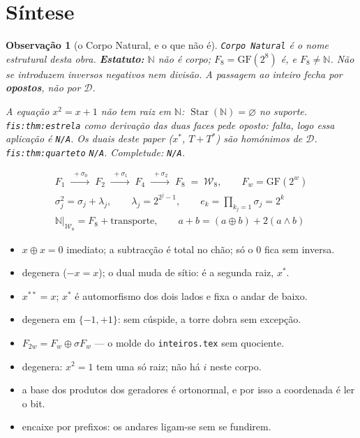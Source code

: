 \documentclass[11pt,a4paper]{article}
\newtheorem{observacao}{Observação}
\newcommand{\code}[1]{\texttt{\small #1}}
\newcommand{\Word}{\mathcal{W}}
\begin{document}
\section*{Síntese}

\begin{observacao}[o Corpo Natural, e o que não é]
\texttt{Corpo Natural} é o nome estrutural desta obra. \textbf{Estatuto:}
$\mathbb{N}$ não é corpo; $F_8=\mathrm{GF}(2^{8})$ é, e $F_8\neq\mathbb{N}$.
Não se introduzem inversos negativos nem divisão. A passagem ao inteiro fecha
por \textbf{opostos}, não por $\mathcal{D}$.

A equação $x^{2}=x+1$ não tem raiz em $\mathbb{N}$:
$\operatorname{Star}(\mathbb{N})=\varnothing$ no suporte.
\code{fis:thm:estrela} como derivação das duas faces pede oposto: falta, logo
essa aplicação é \texttt{N/A}. Os duais deste paper ($x^{*}$, $T+T^{*}$) são
homónimos de $\mathcal{D}$. \code{fis:thm:quarteto} \texttt{N/A}. Completude:
\texttt{N/A}.
\end{observacao}

\[
\boxed{
\begin{array}{c}
F_1\;\xrightarrow{\;+\sigma_0\;}\;F_2\;\xrightarrow{\;+\sigma_1\;}\;F_4
\;\xrightarrow{\;+\sigma_2\;}\;F_8\;=\;\Word_8,
\qquad F_w=\mathrm{GF}(2^{w})\\[3pt]
\sigma_j^{2}=\sigma_j+\lambda_j,\qquad \lambda_j=2^{2^{j}-1},\qquad
e_k=\textstyle\prod_{k_j=1}\sigma_j=2^{k}\\[3pt]
\mathbb{N}\big|_{\Word_8}=F_8+\text{transporte},\qquad
a+b=(a\oplus b)+2(a\wedge b)
\end{array}}
\]

\begin{itemize}\itemsep2pt
\item[\textbf{0}] $x\oplus x=0$ imediato; a subtracção é total no chão; só o $0$ fica sem inversa.
\item[\textbf{1}] degenera ($-x=x$); o dual muda de sítio: é a segunda raiz, $x^{*}$.
\item[\textbf{2}] $x^{**}=x$; $x^{*}$ é automorfismo dos dois lados e fixa o andar de baixo.
\item[\textbf{3}] degenera em $\{-1,+1\}$: sem cúspide, a torre dobra sem excepção.
\item[\textbf{4}] $F_{2w}=F_w\oplus\sigma F_w$ --- o molde do \code{inteiros.tex} sem quociente.
\item[\textbf{5}] degenera: $x^2=1$ tem uma só raiz; não há $i$ neste corpo.
\item[\textbf{6}] a base dos produtos dos geradores é ortonormal, e por isso a coordenada é ler o bit.
\item[\textbf{7}] encaixe por prefixos: os andares ligam-se sem se fundirem.
\end{itemize}
\end{document}
